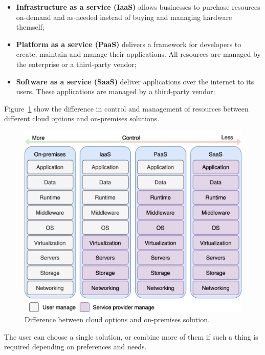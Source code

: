 \begin{itemize}
	\item \textbf{Infrastructure as a service (IaaS)} allows businesses to purchase resources on-demand and as-needed instead of buying and managing hardware themself;
	\item \textbf{Platform as a service (PaaS)} delivers a framework for developers to create, maintain and manage their applications. All resources are managed by the enterprise or a third-party vendor;
	\item \textbf{Software as a service (SaaS)} deliver applications over the internet to its users. These applications are managed by a third-party vendor;
\end{itemize}

\noindent
Figure~\ref{fig:fig1} show the difference in control and management of resources between different cloud options and on-premises solutions.

\begin{figure}[H]
	\begin{center}
		\includegraphics[scale=0.9]{images/Figure1.png}
	\end{center}
	\vspace{-0.6cm}
	\caption{Difference between cloud options and on-premises solution.}
	\label{fig:fig1}
\end{figure}

\noindent
The user can choose a single solution, or combine more of them if such a thing is required depending on preferences and needs.


